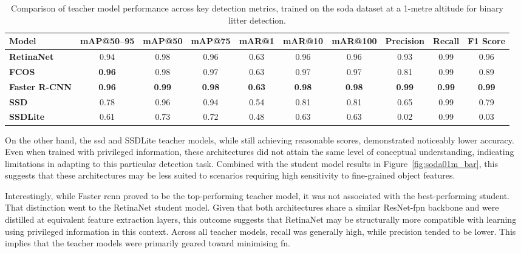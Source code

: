 \begin{table}[!ht]
    \centering
    \begin{adjustbox}{max width=\textwidth}
    \renewcommand{\arraystretch}{1.5}
    \begin{tabular}{|l|c|c|c|c|c|c|c|c|c|}
        \hline%
        \textbf{Model} & \textbf{mAP@50--95} & \textbf{mAP@50} & \textbf{mAP@75} & \textbf{mAR@1} & \textbf{mAR@10} & \textbf{mAR@100} & \textbf{Precision} & \textbf{Recall} & \textbf{F1 Score} \\ \hline \hline
        \textbf{RetinaNet} & 0.94 & 0.98 & 0.96 & 0.63 & 0.96 & 0.96 & 0.93 & 0.99 & 0.96 \\\hline
        \textbf{FCOS} & \textbf{0.96} & 0.98 & 0.97 & 0.63 & 0.97 & 0.97 & 0.81 & 0.99 & 0.89 \\\hline
        \textbf{Faster R-CNN} & \textbf{0.96} & \textbf{0.99} & \textbf{0.98} & \textbf{0.63} & \textbf{0.98} & \textbf{0.98} & \textbf{0.99} & \textbf{0.99} & \textbf{0.99} \\\hline
        \textbf{SSD} & 0.78 & 0.96 & 0.94 & 0.54 & 0.81 & 0.81 & 0.65 & 0.99 & 0.79 \\\hline
        \textbf{SSDLite} & 0.61 & 0.73 & 0.72 & 0.48 & 0.63 & 0.63 & 0.02 & 0.99 & 0.03 \\
        \hline%
    \end{tabular}
    \renewcommand{\arraystretch}{1}
    \end{adjustbox}
    \caption{Comparison of teacher model performance across key detection metrics, trained on the \gls{soda} dataset at a 1-metre altitude for binary litter detection.}
    \label{tab:teacher_model_metrics_soda01m}
\end{table}

On the other hand, the \gls{ssd} and SSDLite teacher models, while still achieving reasonable scores, demonstrated noticeably lower accuracy. Even when trained with privileged information, these architectures did not attain the same level of conceptual understanding, indicating limitations in adapting to this particular detection task. Combined with the student model results in Figure~\ref{fig:soda01m_bar}, this suggests that these architectures may be less suited to scenarios requiring high sensitivity to fine-grained object features.

Interestingly, while Faster \gls{rcnn} proved to be the top-performing teacher model, it was not associated with the best-performing student. That distinction went to the RetinaNet student model. Given that both architectures share a similar ResNet-\gls{fpn} backbone and were distilled at equivalent feature extraction layers, this outcome suggests that RetinaNet may be structurally more compatible with learning using privileged information in this context.
Across all teacher models, recall was generally high, while precision tended to be lower. This implies that the teacher models were primarily geared toward minimising \gls{fn}.

